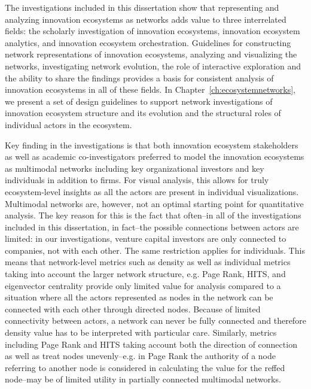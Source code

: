 The investigations included in this dissertation show that representing and analyzing innovation ecosystems as networks adds value to three interrelated fields: the scholarly investigation of innovation ecosystems, innovation ecosystem analytics, and innovation ecosystem orchestration. Guidelines for constructing network representations of innovation ecosystems, analyzing and visualizing the networks, investigating network evolution, the role of interactive exploration and the ability to share the findings provides a basis for consistent analysis of innovation ecosystems in all of these fields. In Chapter~\ref{ch:ecosystemnetworks}, we present a set of design guidelines to support network investigations of innovation ecosystem structure and its evolution and the structural roles of individual actors in the ecosystem. 

Key finding in the investigations is that both innovation ecosystem stakeholders as well as academic co-investigators preferred to model the innovation ecosystems as multimodal networks including key organizational investors and key individuals in addition to firms. For visual analysis, this allows for truly ecosystem-level insights as all the actors are present in individual visualizations. Multimodal networks are, however, not an optimal starting point for quantitative analysis. The key reason for this is the fact that often--in all of the investigations included in this dissertation, in fact--the possible connections between actors are limited: in our investigations, venture capital investors are only connected to companies, not with each other. The same restriction applies for individuals. This means that network-level metrics such as density as well as individual metrics taking into account the larger network structure, e.g. Page Rank, HITS, and eigenvector centrality provide only limited value for analysis compared to a situation where all the actors represented as nodes in the network can be connected with each other through directed nodes. Because of limited connectivity between actors, a network can never be fully connected and therefore density value has to be interpreted with particular care. Similarly, metrics including Page Rank and HITS taking account both the direction of connection as well as treat nodes unevenly--e.g. in Page Rank the authority of a node referring to another node is considered in calculating the value for the reffed node--may be of limited utility in partially connected multimodal networks.

